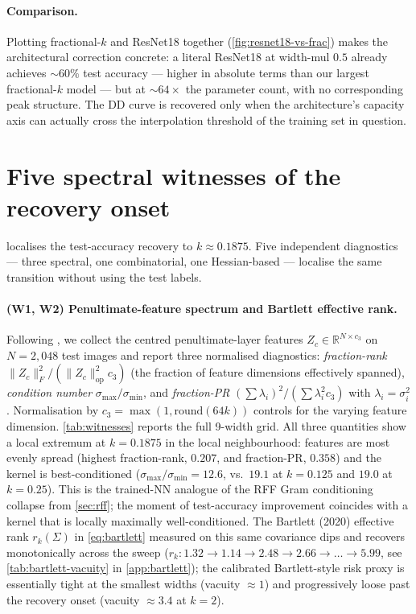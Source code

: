 \paragraph{Comparison.} Plotting fractional-$k$ and ResNet18 together (\cref{fig:resnet18-vs-frac}) makes the architectural correction concrete: a literal ResNet18 at width-mul $0.5$ already achieves $\sim$$60\%$ test accuracy --- higher in absolute terms than our largest fractional-$k$ model --- but at $\sim$$64\times$ the parameter count, with no corresponding peak structure. The DD curve is recovered only when the architecture's capacity axis can actually cross the interpolation threshold of the training set in question.

\section{Five spectral witnesses of the recovery onset}
\label{sec:spectral}

 localises the test-accuracy recovery to $k\!\approx\!0.1875$. Five independent diagnostics --- three spectral, one combinatorial, one Hessian-based --- localise the same transition without using the test labels.

\paragraph{(W1, W2) Penultimate-feature spectrum and Bartlett effective rank.} Following \citet{bartlett2020benign}, we collect the centred penultimate-layer features $Z_c\in\mathbb{R}^{N\times c_3}$ on $N=2{,}048$ test images and report three normalised diagnostics: \emph{fraction-rank} $\|Z_c\|_F^2/(\|Z_c\|_{\mathrm{op}}^2 c_3)$ (the fraction of feature dimensions effectively spanned), \emph{condition number} $\sigma_{\max}/\sigma_{\min}$, and \emph{fraction-PR} $(\sum\lambda_i)^2/(\sum\lambda_i^2 c_3)$ with $\lambda_i = \sigma_i^2$. Normalisation by $c_3 = \max(1, \mathrm{round}(64k))$ controls for the varying feature dimension. \cref{tab:witnesses} reports the full 9-width grid. All three quantities show a local extremum at $k\!=\!0.1875$ in the local neighbourhood: features are most evenly spread (highest fraction-rank, $0.207$, and fraction-PR, $0.358$) and the kernel is best-conditioned ($\sigma_{\max}/\sigma_{\min}\!=\!12.6$, vs.\ $19.1$ at $k\!=\!0.125$ and $19.0$ at $k\!=\!0.25$). This is the trained-NN analogue of the RFF Gram conditioning collapse from \cref{sec:rff}; the moment of test-accuracy improvement coincides with a kernel that is locally maximally well-conditioned. The Bartlett (2020) effective rank $r_k(\Sigma)$ in \cref{eq:bartlett} measured on this same covariance dips and recovers monotonically across the sweep ($r_k\!:\!1.32\!\to\!1.14\!\to\!2.48\!\to\!2.66\!\to\!\ldots\!\to\!5.99$, see \cref{tab:bartlett-vacuity} in \cref{app:bartlett}); the calibrated Bartlett-style risk proxy is essentially tight at the smallest widths (vacuity $\approx 1$) and progressively loose past the recovery onset (vacuity $\approx 3.4$ at $k\!=\!2$).

